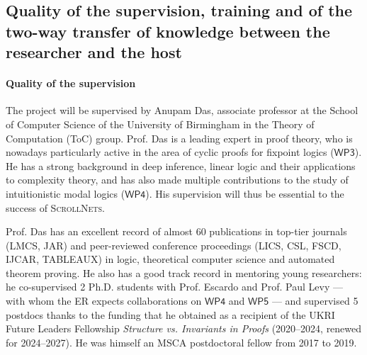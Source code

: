 \documentclass[12pt,draftproposal]{msca-pf}
\newcommand{\proj}{\small\textsc{ScrollNets}}
\newcommand{\WP}[1]{$\mathsf{WP#1}$}
\begin{document}



\subsection{Quality of the supervision, training and of the two-way transfer of
    knowledge between the researcher and the host}
\label{ssc:excellence:supervision}

\paragraph{Quality of the supervision}
The project will be supervised by Anupam Das, associate professor at the School of Computer Science
of the University of Birmingham in the Theory of Computation (ToC) group. Prof. Das is a leading
expert in proof theory, who is nowadays particularly active in the area of cyclic proofs for
fixpoint logics (\WP{3}). He has a strong background in deep inference, linear logic and their
applications to complexity theory, and has also made multiple contributions to the study of
intuitionistic modal logics (\WP{4}). His supervision will thus be essential to the success of
{\proj}.

Prof. Das has an excellent record of almost 60 publications in top-tier journals (LMCS, JAR) and
peer-reviewed conference proceedings (LICS, CSL, FSCD, IJCAR, TABLEAUX) in logic, theoretical
computer science and automated theorem proving. He also has a good track record in mentoring young
researchers: he co-supervised 2 Ph.D. students with Prof. Escardo and Prof. Paul Levy --- with whom
the ER expects collaborations on \WP{4} and \WP{5} --- and supervised 5 postdocs thanks to the
funding that he obtained as a recipient of the UKRI Future Leaders Fellowship \textit{Structure vs.
Invariants in Proofs} (2020--2024, renewed for 2024--2027). He was himself an MSCA postdoctoral
fellow from 2017 to 2019.
\end{document}
